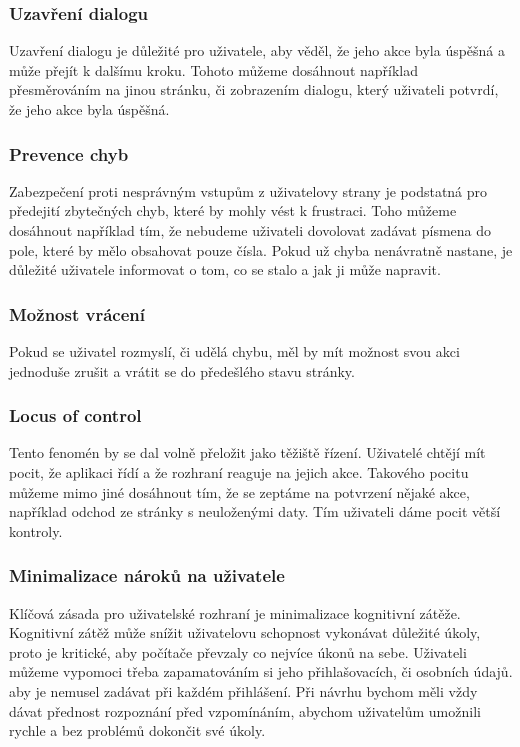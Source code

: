\subsubsection*{Uzavření dialogu}
Uzavření dialogu je důležité pro uživatele, aby věděl, že jeho akce byla úspěšná a může přejít k dalšímu kroku. Tohoto můžeme dosáhnout například přesměrováním na jinou stránku, či zobrazením dialogu, který uživateli potvrdí, že jeho akce byla úspěšná.
\pagebreak

\subsubsection*{Prevence chyb}
Zabezpečení proti nesprávným vstupům z uživatelovy strany je podstatná pro předejití zbytečných chyb, které by mohly vést k frustraci. Toho můžeme dosáhnout například tím, že nebudeme uživateli dovolovat zadávat písmena do pole, které by mělo obsahovat pouze čísla. Pokud už chyba nenávratně nastane, je důležité uživatele informovat o tom, co se stalo a jak ji může napravit.

\subsubsection*{Možnost vrácení}
Pokud se uživatel rozmyslí, či udělá chybu, měl by mít možnost svou akci jednoduše zrušit a vrátit se do předešlého stavu stránky.

\subsubsection*{Locus of control}
Tento fenomén by se dal volně přeložit jako těžiště řízení. Uživatelé chtějí mít pocit, že aplikaci řídí a že rozhraní reaguje na jejich akce. Takového pocitu můžeme mimo jiné dosáhnout tím, že se zeptáme na potvrzení nějaké akce, například odchod ze stránky s neuloženými daty. Tím uživateli dáme pocit větší kontroly.

\subsubsection*{Minimalizace nároků na uživatele}
Klíčová zásada pro uživatelské rozhraní je minimalizace kognitivní zátěže. Kognitivní zátěž může snížit uživatelovu schopnost vykonávat důležité úkoly, proto je kritické, aby počítače převzaly co nejvíce úkonů na sebe. Uživateli můžeme vypomoci třeba zapamatováním si jeho přihlašovacích, či osobních údajů. aby je nemusel zadávat při každém přihlášení. Při návrhu bychom měli vždy dávat přednost rozpoznání před vzpomínáním, abychom uživatelům umožnili rychle a bez problémů dokončit své úkoly.

